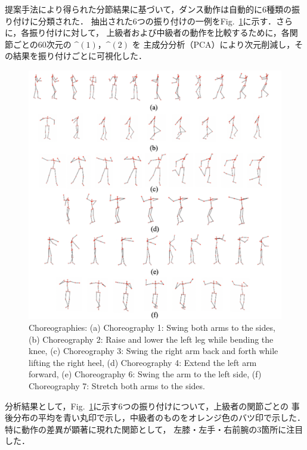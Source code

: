 \documentclass[conference]{IEEEtran}
\begin{document}
提案手法により得られた分節結果に基づいて，ダンス動作は自動的に6種類の振り付けに分類された．
抽出された6つの振り付けの一例をFig.~\ref{fig:choreography}に示す．さらに，各振り付けに対して，
上級者および中級者の動作を比較するために，各関節ごとの60次元の $\bm^{(1)}$，$\bm^{(2)}$ を
主成分分析（PCA）により次元削減し，その結果を振り付けごとに可視化した．
%
\begin{figure}[t]
	\centering
	\includegraphics[scale=0.4]{fig/choreography.pdf}
	\caption{Choreographies: (a) Choreography 1: Swing both arms to the sides, 
  (b) Choreography 2: Raise and lower the left leg while bending the knee, 
  (c) Choreography 3: Swing the right arm back and forth while lifting the right heel, 
  (d) Choreography 4: Extend the left arm forward, 
  (e) Choreography 6: Swing the arm to the left side, 
  (f) Choreography 7: Stretch both arms to the sides.}
	\label{fig:choreography}
	\vspace{-0.4cm}
\end{figure}
%
分析結果として，Fig.~\ref{fig:choreography}に示す6つの振り付けについて，上級者の関節ごとの
事後分布の平均を青い丸印で示し，中級者のものをオレンジ色のバツ印で示した．特に動作の差異が顕著に現れた関節として，
左膝・左手・右前腕の3箇所に注目した．
\end{document}
